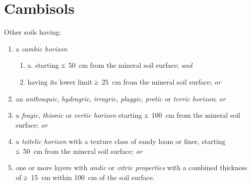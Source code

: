 \documentclass[
  letterpaper,
  DIV=11,
  numbers=noendperiod]{scrreprt}
\providecommand{\tightlist}{%
  \setlength{\itemsep}{0pt}\setlength{\parskip}{0pt}}\usepackage{longtable,booktabs,array}
\begin{document}

\hypertarget{key-cambisols}{%
\chapter{Cambisols}\label{key-cambisols}}

Other soils having:

\begin{enumerate}
\def\labelenumi{\arabic{enumi}.}
\tightlist
\item
  a \emph{cambic horizon}

  \begin{enumerate}
  \def\labelenumii{\alph{enumii}.}
  \tightlist
  \item
    a. starting ≤~50~cm from the mineral soil surface; \emph{and}
  \item
    having its lower limit ≥~25~cm from the mineral soil surface;
    \emph{or}
  \end{enumerate}
\item
  an \emph{anthraquic}, \emph{hydragric}, \emph{irragric},
  \emph{plaggic}, \emph{pretic} or \emph{terric horizon}; \emph{or}
\item
  a \emph{fragic}, \emph{thionic} or \emph{vertic horizon} starting
  ≤~100~cm from the mineral soil surface; \emph{or}
\item
  a \emph{tsitelic horizon} with a texture class of sandy loam or finer,
  starting ≤~50~cm from the mineral soil surface; \emph{or}
\item
  one or more layers with \emph{andic} or \emph{vitric properties} with
  a combined thickness of ≥~15~cm within 100~cm of the soil surface.
\end{enumerate}
\end{document}
